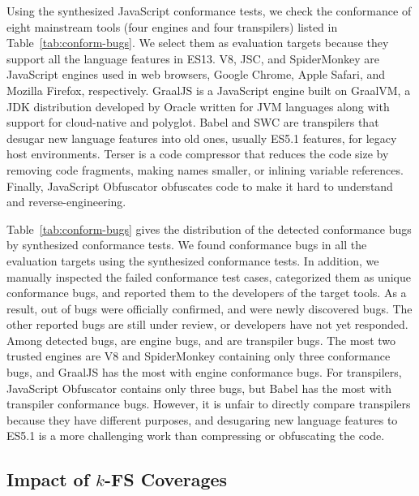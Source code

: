 
Using the synthesized JavaScript conformance tests, we check the conformance of
eight mainstream tools (four engines and four transpilers) listed in
Table~\ref{tab:conform-bugs}.
%
We select them as evaluation targets because they support all the language
features in ES13.
%
V8, JSC, and SpiderMonkey are JavaScript engines used in web browsers, Google
Chrome, Apple Safari, and Mozilla Firefox, respectively.
%
GraalJS is a JavaScript engine built on GraalVM, a JDK distribution developed by
Oracle written for JVM languages along with support for cloud-native and
polyglot.
%
Babel and SWC are transpilers that desugar new language features into old ones,
usually ES5.1 features, for legacy host environments.
%
Terser is a code compressor that reduces the code size by removing code
fragments, making names smaller, or inlining variable references.
%
Finally, JavaScript Obfuscator obfuscates code to make it hard to understand and
reverse-engineering.


Table~\ref{tab:conform-bugs} gives the distribution of the detected conformance
bugs by  synthesized conformance tests.
%
We found conformance bugs in all the evaluation targets using the synthesized
conformance tests.
%
In addition, we manually inspected the failed conformance test cases,
categorized them as  unique conformance bugs, and reported them to
the developers of the target tools.
%
As a result,  out of  bugs were officially confirmed, and
 were newly discovered bugs.
%
The other  reported bugs are still under review, or developers have
not yet responded.
%
Among  detected bugs,  are engine bugs, and  are
transpiler bugs.
%
The most two trusted engines are V8 and SpiderMonkey containing only three
conformance bugs, and GraalJS has the most with  engine conformance
bugs.
%
For transpilers, JavaScript Obfuscator contains only three bugs, but Babel has
the most with  transpiler conformance bugs.
%
However, it is unfair to directly compare transpilers because they have
different purposes, and desugaring new language features to ES5.1 is a
more challenging work than compressing or obfuscating the code.


\subsection{Impact of $k$-FS Coverages}\label{sec:impact-k-fs}

